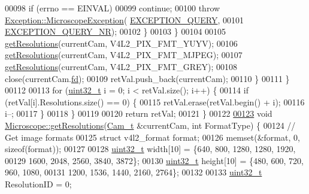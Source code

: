 \begin{DoxyCode}
00098           \textcolor{keywordflow}{if} (errno == EINVAL)
00099             \textcolor{keywordflow}{continue};
00100           \textcolor{keywordflow}{throw} \hyperlink{class_hardware_1_1_exception_1_1_microscope_exception}{Exception::MicroscopeException}(
      \hyperlink{_microscope_not_found_exception_8h_aff89937633d667a17b2bff80551e4574}{EXCEPTION\_QUERY},
00101                                                \hyperlink{_microscope_not_found_exception_8h_acb42acfdb2279208d47da5b3c3018f9d}{EXCEPTION\_QUERY\_NR});
00102         \}
00103       \}
00104 
00105       \hyperlink{class_hardware_1_1_microscope_ab4b24bd8062cafb1bfe47967ac66254e}{getResolutions}(currentCam, V4L2\_PIX\_FMT\_YUYV);
00106       \hyperlink{class_hardware_1_1_microscope_ab4b24bd8062cafb1bfe47967ac66254e}{getResolutions}(currentCam, V4L2\_PIX\_FMT\_MJPEG);
00107       \hyperlink{class_hardware_1_1_microscope_ab4b24bd8062cafb1bfe47967ac66254e}{getResolutions}(currentCam, V4L2\_PIX\_FMT\_GREY);
00108       close(currentCam.\hyperlink{struct_hardware_1_1_microscope_1_1_cam__t_ab8d692f05f97f5f3cc0401f750d9ad2e}{fd});
00109       retVal.push\_back(currentCam);
00110     \}
00111   \}
00112 
00113   \textcolor{keywordflow}{for} (\hyperlink{_soil_math_types_8h_a435d1572bf3f880d55459d9805097f62}{uint32\_t} i = 0; i < retVal.size(); i++) \{
00114     \textcolor{keywordflow}{if} (retVal[i].Resolutions.size() == 0) \{
00115       retVal.erase(retVal.begin() + i);
00116       i--;
00117     \}
00118   \}
00119 
00120   \textcolor{keywordflow}{return} retVal;
00121 \}
00122 
\hypertarget{_microscope_8cpp_source_l00123}{}\hyperlink{class_hardware_1_1_microscope_ab4b24bd8062cafb1bfe47967ac66254e}{00123} \textcolor{keywordtype}{void} \hyperlink{class_hardware_1_1_microscope_ab4b24bd8062cafb1bfe47967ac66254e}{Microscope::getResolutions}(\hyperlink{struct_hardware_1_1_microscope_1_1_cam__t}{Cam\_t} &currentCam, \textcolor{keywordtype}{int} FormatType) \{
00124   \textcolor{comment}{// Get image formats}
00125   \textcolor{keyword}{struct }v4l2\_format format;
00126   memset(&format, 0, \textcolor{keyword}{sizeof}(format));
00127 
00128   \hyperlink{_soil_math_types_8h_a435d1572bf3f880d55459d9805097f62}{uint32\_t} width[10] = \{640,  800,  1280, 1280, 1920,
00129                         1600, 2048, 2560, 3840, 3872\};
00130   \hyperlink{_soil_math_types_8h_a435d1572bf3f880d55459d9805097f62}{uint32\_t} height[10] = \{480,  600,  720,  960,  1080,
00131                          1200, 1536, 1440, 2160, 2764\};
00132 
00133   \hyperlink{_soil_math_types_8h_a435d1572bf3f880d55459d9805097f62}{uint32\_t} ResolutionID = 0;

\end{DoxyCode}
